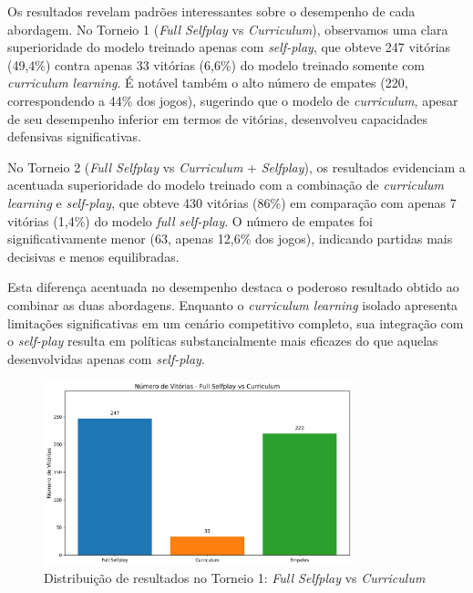 Os resultados revelam padrões interessantes sobre o desempenho de cada abordagem. No Torneio 1 (\textit{Full Selfplay} vs \textit{Curriculum}), observamos uma clara superioridade do modelo treinado apenas com \textit{self-play}, que obteve 247 vitórias (49,4\%) contra apenas 33 vitórias (6,6\%) do modelo treinado somente com \textit{curriculum learning}. É notável também o alto número de empates (220, correspondendo a 44\% dos jogos), sugerindo que o modelo de \textit{curriculum}, apesar de seu desempenho inferior em termos de vitórias, desenvolveu capacidades defensivas significativas.

No Torneio 2 (\textit{Full Selfplay} vs \textit{Curriculum} + \textit{Selfplay}), os resultados evidenciam a acentuada superioridade do modelo treinado com a combinação de \textit{curriculum learning} e \textit{self-play}, que obteve 430 vitórias (86\%) em comparação com apenas 7 vitórias (1,4\%) do modelo \textit{full self-play}. O número de empates foi significativamente menor (63, apenas 12,6\% dos jogos), indicando partidas mais decisivas e menos equilibradas.

Esta diferença acentuada no desempenho destaca o poderoso resultado obtido ao combinar as duas abordagens. Enquanto o \textit{curriculum learning} isolado apresenta limitações significativas em um cenário competitivo completo, sua integração com o \textit{self-play} resulta em políticas substancialmente mais eficazes do que aquelas desenvolvidas apenas com \textit{self-play}.

\begin{figure}[H]
    \centering
    \includegraphics[width=0.8\textwidth]{fig/graficos_trabalho/graficos_torneios/torneios/vitorias_full_selfplay_vs_curriculum.png}
    \caption{Distribuição de resultados no Torneio 1: \textit{Full Selfplay} vs \textit{Curriculum}}
    \label{fig:vitorias_torneio1}
\end{figure}

